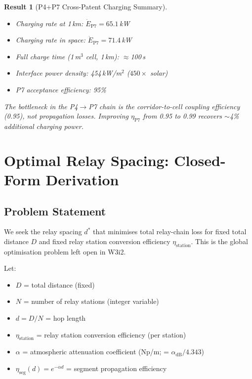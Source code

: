 \documentclass[aps,prd,twocolumn,superscriptaddress]{revtex4-2}
\newtheorem{result}{Result}
\begin{document}
\begin{result}[P4+P7 Cross-Patent Charging Summary]
\begin{itemize}
\item Charging rate at 1\,km: $\dot{E}_\mathrm{P7} = 65.1$\,kW
\item Charging rate in space: $\dot{E}_\mathrm{P7} = 71.4$\,kW
\item Full charge time (1\,m$^3$ cell, 1\,km): $\approx$100\,s
\item Interface power density: 454\,kW/m$^2$ ($450\times$ solar)
\item P7 acceptance efficiency: 95\%
\end{itemize}

The bottleneck in the P4$\to$P7 chain is the corridor-to-cell coupling
efficiency (0.95), not propagation losses.  Improving $\eta_\mathrm{P7}$
from 0.95 to 0.99 recovers $\sim$4\% additional charging power.
\end{result}

\section{Optimal Relay Spacing: Closed-Form Derivation}
\label{sec:optimal_relay}

\subsection{Problem Statement}

We seek the relay spacing $d^*$ that minimises total relay-chain loss
for fixed total distance $D$ and fixed relay station conversion efficiency
$\eta_\mathrm{station}$.  This is the global optimisation problem left
open in W3i2.

Let:
\begin{itemize}
\item $D$ = total distance (fixed)
\item $N$ = number of relay stations (integer variable)
\item $d = D/N$ = hop length
\item $\eta_\mathrm{station}$ = relay station conversion efficiency (per station)
\item $\alpha$ = atmospheric attenuation coefficient (Np/m; = $\alpha_\mathrm{dB}/4.343$)
\item $\eta_\mathrm{seg}(d) = e^{-\alpha d}$ = segment propagation efficiency
\end{itemize}
\end{document}
